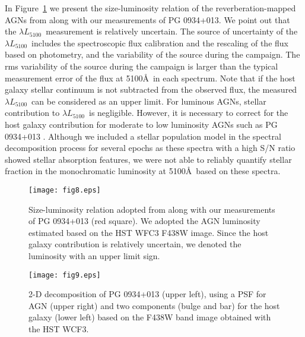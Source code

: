 \documentclass[iop]{emulateapj}
\newcommand{\lf}{\ensuremath{L_{5100}}}
\begin{document}
In Figure~\ref{fig7} we present the size-luminosity relation of the reverberation-mapped AGNs from \citet{Bentz2013} along with our measurements of PG 0934+013. We point out that the $\lambda$\lf\ measurement is relatively uncertain. The source of uncertainty of the $\lambda$\lf\ includes the spectroscopic flux calibration and the rescaling of the flux based on photometry, and the variability of the source during the campaign. The rms variability of the source during the campaign is larger than the typical measurement error of the flux at 5100\AA\ in each spectrum.
Note that if the host galaxy stellar continuum is not subtracted from the observed flux, the measured $\lambda$\lf\ can be considered as an upper limit. For luminous AGNs, stellar contribution to $\lambda$\lf\ is negligible. However, it is necessary to correct for the host galaxy contribution for moderate to low luminosity AGNs such as PG 0934+013 \citep[e.g.,][]{Bentz2013}. Although we included a stellar population model in the spectral decomposition process for several epochs as these spectra with a high S/N ratio showed stellar absorption features, we were not able to reliably quantify stellar fraction in the monochromatic luminosity at 5100\AA\ based on these spectra.

\begin{figure}
	\texttt{[image: fig8.eps]}
	\caption{Size-luminosity relation adopted from \citet{Bentz2013} along with our measurements of PG 0934+013 (red square). We adopted the AGN luminosity estimated based on the HST WFC3 F438W image. Since the host galaxy contribution is relatively uncertain, we denoted the luminosity 
	with an upper limit sign. 
		\label{fig7}}
\end{figure} 

\begin{figure}
	\texttt{[image: fig9.eps]}
	\caption{2-D decomposition of PG 0934+013 (upper left), using a PSF for AGN (upper right) and two components (bulge and bar) for the host galaxy (lower left)
	based on the F438W band image obtained with the HST WCF3. 
}
\end{figure} 
\end{document}
